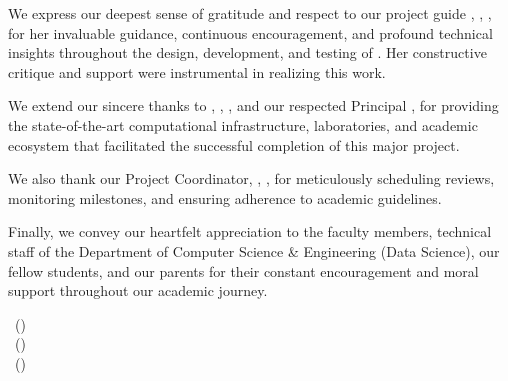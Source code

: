 
We express our deepest sense of gratitude and respect to our project guide \textbf{\GuideName}, \GuideDesignation, \Department, for her invaluable guidance, continuous encouragement, and profound technical insights throughout the design, development, and testing of \textbf{\ProjectTitle}. Her constructive critique and support were instrumental in realizing this work.

We extend our sincere thanks to \textbf{\HODName}, \HODDesignation, \Department, and our respected Principal \textbf{\PrincipalName}, for providing the state-of-the-art computational infrastructure, laboratories, and academic ecosystem that facilitated the successful completion of this major project.

We also thank our Project Coordinator, \textbf{\CoordinatorName}, \CoordinatorDesignation, for meticulously scheduling reviews, monitoring milestones, and ensuring adherence to academic guidelines. 

Finally, we convey our heartfelt appreciation to the faculty members, technical staff of the Department of Computer Science \& Engineering (Data Science), our fellow students, and our parents for their constant encouragement and moral support throughout our academic journey.

\vfill
\begin{flushright}
\StudentOne\ (\RollOne)\\\StudentTwo\ (\RollTwo)\\\StudentThree\ (\RollThree)
\end{flushright}
